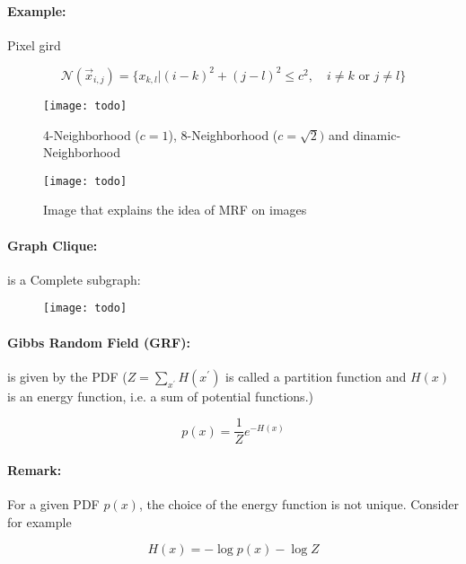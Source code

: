 \paragraph{Example:}
Pixel gird

\begin{equation*}
	\mathcal{N}(\vec{x}_{i,j}) = \{x_{k,l}| (i-k)^2 + (j-l)^2 \le c^2, \quad i \not = k \text{ or } j \not = l\}
\end{equation*}

\begin{figure}[H]
	\centering
	\texttt{[image: todo]}
	\caption{4-Neighborhood ($c=1$), 8-Neighborhood ($c=\sqrt{2})$ and dinamic-Neighborhood}
\end{figure}

\begin{figure}[H]
	\centering
	\texttt{[image: todo]}
	\caption{Image that explains the idea of MRF on images}
\end{figure}


\paragraph{Graph Clique:} is a Complete subgraph:

\begin{figure}[H]
	\centering
	\texttt{[image: todo]}
\end{figure}

\paragraph{Gibbs Random Field (GRF):} is given by the PDF ($Z = \sum_{x^\prime} H(x^{\prime})$ is called a partition function and $H(x)$ is an energy function, i.e. a sum of potential functions.)

\begin{equation*}
	p(x) = \frac{1}{Z} e^{-H(x)}
\end{equation*}

\paragraph{Remark:}
For a given PDF $p(x)$, the choice of the energy function is not unique. Consider for example

\begin{equation*}
	H(x) = - \log p(x) - \log Z
\end{equation*}

